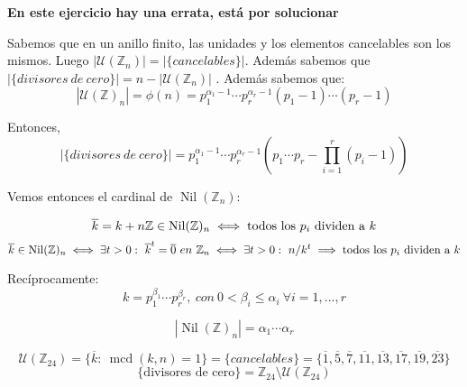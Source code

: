 \documentclass[openany]{book}
\begin{document}
\begin{exercise}

    \begin{flushright}
        \textbf{En este ejercicio hay una errata, está por solucionar}
    \end{flushright}

    Sabemos que en un anillo finito, las unidades y los elementos cancelables son los mismos. Luego $ |\mathcal{U}(\mathbb{Z}_{n})| = |\{cancelables\}|$. Además sabemos que $ |\{divisores\ de\ cero\}| = n - |\mathcal{U}(\mathbb{Z}_{n})|  $ . Además sabemos que:
    $$ |\mathcal{U}(\mathbb{Z})_{n}| = \phi(n ) = p_1^{\alpha_1-1}\cdots p_{r}^{\alpha_{r}-1} (p_1-1)\cdots (p_{r}-1) $$

    Entonces,
    $$ |\{divisores\ de\ cero\}| = p_1^{\alpha_1-1} \cdots p_{r}^{\alpha_{r}-1} (p_1\cdots p_{r}- \prod_{i=1}^{r}(p_i-1)) $$

    Vemos entonces el cardinal de $ \operatorname{Nil}(\mathbb{Z}_{n}) $:

    $$ \overline{k} = k+n\mathbb{Z} \in  \operatorname{Nil}(\mathbb{Z})_{n} \iff \text{todos los $  p_i$ dividen a }k $$
    $$ \overline{k} \in \operatorname{Nil}(\mathbb{Z})_{n} \iff \exists t>0:\ \overline{k}^{t} = \overline{0}\ en\ \mathbb{Z}_{n}\iff \exists t>0:\ n/k^{t} \implies \text{todos los $ p_i $ dividen a }k$$

    Recíprocamente:
    $$ k = p_1^{\beta_1}\cdots p_{r}^{\beta_{r}},\ con\ 0<\beta_i \leq  \alpha_i\ \forall i = 1,...,r $$

    $$ |\operatorname{Nil}(\mathbb{Z})_{n}| = \alpha_1\cdots \alpha_{r} $$
\end{exercise}


\begin{exercise}
    $$ \mathcal{U}(\mathbb{Z}_{24}) = \{\overline{k}:\ \operatorname{mcd}(k,n) = 1\} = \{cancelables\} = \{\overline{1},\overline{5},\overline{7},\overline{11},\overline{13},\overline{17},\overline{19},\overline{23}\} $$
    $$ \{\text{divisores de cero}\} = \mathbb{Z}_{24} \setminus \mathcal{U}(\mathbb{Z}_{24}) $$


\end{exercise}

\setcounter{ex}{5}
\end{document}
